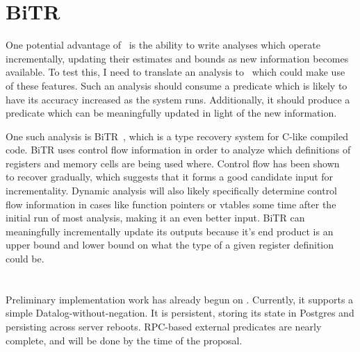 \section{BiTR}
One potential advantage of \sysname\ is the ability to write analyses which operate incrementally, updating their estimates and bounds as new information becomes available.
To test this, I need to translate an analysis to \sysname\ which could make use of these features.
Such an analysis should consume a predicate which is likely to have its accuracy increased as the system runs.
Additionally, it should produce a predicate which can be meaningfully updated in light of the new information.

One such analysis is BiTR~\cite{bitr}, which is a type recovery system for C-like compiled code.
BiTR uses control flow information in order to analyze which definitions of registers and memory cells are being used where.
Control flow has been shown~\cite{jakstab} to recover gradually, which suggests that it forms a good candidate input for incrementality.
Dynamic analysis will also likely specifically determine control flow information in cases like function pointers or vtables some time after the initial run of most analysis, making it an even better input.
BiTR can meaningfully incrementally update its outputs because it's end product is an upper bound and lower bound on what the type of a given register definition could be.

\section{\sysname}
Preliminary implementation work has already begun on \sysname.
Currently, it supports a simple Datalog-without-negation.
It is persistent, storing its state in Postgres and persisting across server reboots.
RPC-based external predicates are nearly complete, and will be done by the time of the proposal.
